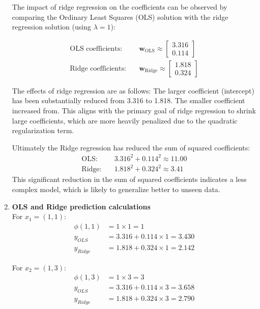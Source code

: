 \documentclass{article}
\begin{document}
\begin{enumerate}[leftmargin=\labelsep]
The impact of ridge regression on the coefficients can be observed by comparing the Ordinary Least Squares (OLS) solution with the ridge regression solution (using $\lambda = 1$):

\begin{align*}
\text{OLS coefficients:} & \quad \boldsymbol{w}_{\text{OLS}} \approx \begin{bmatrix} 3.316 \\ 0.114 \end{bmatrix} \\[10pt]
\text{Ridge coefficients:} & \quad \boldsymbol{w}_{\text{Ridge}} \approx \begin{bmatrix} 1.818 \\ 0.324 \end{bmatrix}
\end{align*}

The effects of ridge regression are as follows:
The larger coefficient (intercept) has been substantially reduced from 3.316 to 1.818.
The smaller coefficient increased from.
This aligns with the primary goal of ridge regression to shrink large coefficients, which are more heavily penalized due to the quadratic regularization term.

Ultimately the Ridge regression has reduced the sum of squared coefficients:
\begin{align*}
\text{OLS:} & \quad 3.316^2 + 0.114^2 \approx 11.00 \\
\text{Ridge:} & \quad 1.818^2 + 0.324^2 \approx 3.41
\end{align*}
This significant reduction in the sum of squared coefficients indicates a less complex model, which is likely to generalize better to unseen data.

\item 
\textbf{OLS and Ridge prediction calculations}\\

For $x_1 = (1, 1)$:
\begin{align*}
\phi(1, 1) &= 1 \times 1 = 1 \\
y_{OLS} &= 3.316 + 0.114 \times 1 = 3.430 \\
y_{Ridge} &= 1.818 + 0.324 \times 1 = 2.142
\end{align*}

For $x_2 = (1, 3)$:
\begin{align*}
\phi(1, 3) &= 1 \times 3 = 3 \\
y_{OLS} &= 3.316 + 0.114 \times 3 = 3.658 \\
y_{Ridge} &= 1.818 + 0.324 \times 3 = 2.790
\end{align*}


\end{enumerate}
\end{document}
